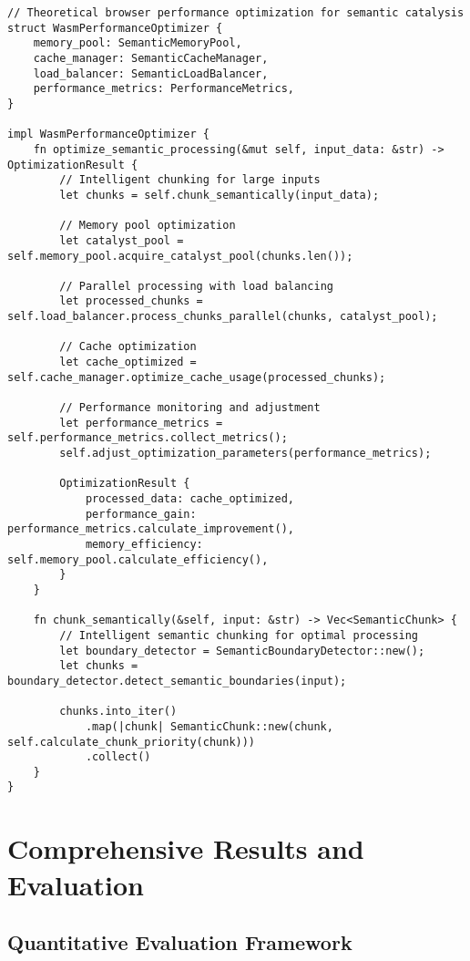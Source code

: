 \documentclass[12pt,a4paper,twoside]{article}
\begin{document}
\begin{lstlisting}[caption=Advanced Browser Performance Optimization]
// Theoretical browser performance optimization for semantic catalysis
struct WasmPerformanceOptimizer {
    memory_pool: SemanticMemoryPool,
    cache_manager: SemanticCacheManager,
    load_balancer: SemanticLoadBalancer,
    performance_metrics: PerformanceMetrics,
}

impl WasmPerformanceOptimizer {
    fn optimize_semantic_processing(&mut self, input_data: &str) -> OptimizationResult {
        // Intelligent chunking for large inputs
        let chunks = self.chunk_semantically(input_data);

        // Memory pool optimization
        let catalyst_pool = self.memory_pool.acquire_catalyst_pool(chunks.len());

        // Parallel processing with load balancing
        let processed_chunks = self.load_balancer.process_chunks_parallel(chunks, catalyst_pool);

        // Cache optimization
        let cache_optimized = self.cache_manager.optimize_cache_usage(processed_chunks);

        // Performance monitoring and adjustment
        let performance_metrics = self.performance_metrics.collect_metrics();
        self.adjust_optimization_parameters(performance_metrics);

        OptimizationResult {
            processed_data: cache_optimized,
            performance_gain: performance_metrics.calculate_improvement(),
            memory_efficiency: self.memory_pool.calculate_efficiency(),
        }
    }

    fn chunk_semantically(&self, input: &str) -> Vec<SemanticChunk> {
        // Intelligent semantic chunking for optimal processing
        let boundary_detector = SemanticBoundaryDetector::new();
        let chunks = boundary_detector.detect_semantic_boundaries(input);

        chunks.into_iter()
            .map(|chunk| SemanticChunk::new(chunk, self.calculate_chunk_priority(chunk)))
            .collect()
    }
}
\end{lstlisting}

\section{Comprehensive Results and Evaluation}

\subsection{Quantitative Evaluation Framework}
\end{document}
